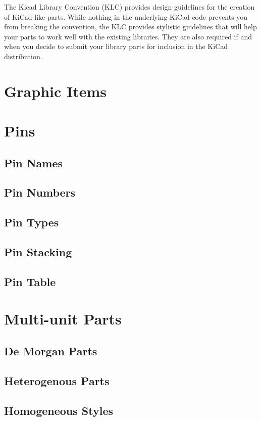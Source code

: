 The Kicad Library Convention (KLC) provides design guidelines for the creation of KiCad-like parts.
While nothing in the underlying KiCad code prevents you from breaking the convention, the KLC provides stylistic guidelines that will help your parts to work well with the existing libraries.
They are also required if and when you decide to submit your library parts for inclusion in the KiCad distribution.



\section{Graphic Items}

\section{Pins}
\subsection{Pin Names}
\subsection{Pin Numbers}
\subsection{Pin Types}
\subsection{Pin Stacking}
\subsection{Pin Table}

\section{Multi-unit Parts}
\subsection{De Morgan Parts}
\subsection{Heterogenous Parts}
\subsection{Homogeneous Styles}

